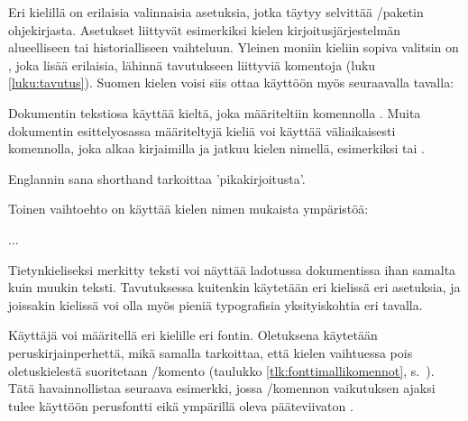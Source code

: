 \begin{koodilohkosis}
  \usepackage{polyglossia}
  \setdefaultlanguage{finnish}
\end{koodilohkosis}

Eri kielillä on erilaisia valinnaisia asetuksia, jotka täytyy selvittää
\-/paketin ohjekirjasta. Asetukset liittyvät
esimerkiksi kielen kirjoitusjärjestelmän alueelliseen tai
historialliseen vaihteluun. Yleinen moniin kieliin sopiva valitsin on
, joka lisää erilaisia, lähinnä tavutukseen
liittyviä komentoja (luku \ref{luku:tavutus}). Suomen kielen voisi siis
ottaa käyttöön myös seuraavalla tavalla:

\begin{koodilohkosis}
  \setdefaultlanguage[babelshorthands]{finnish}
\end{koodilohkosis}

Dokumentin tekstiosa käyttää kieltä, joka määriteltiin komennolla
. Muita dokumentin esittelyosassa
määriteltyjä kieliä voi käyttää väliaikaisesti komennolla, joka alkaa
kirjaimilla  ja jatkuu kielen nimellä, esimerkiksi
 tai .

\begin{koodilohkosis}
  Englannin sana \textenglish{shorthand} tarkoittaa 'pikakirjoitusta'.
\end{koodilohkosis}

Toinen vaihtoehto on käyttää kielen nimen mukaista ympäristöä:

\begin{koodilohkosis}
  \begin{greek}
    ...
  \end{greek}
\end{koodilohkosis}

Tietynkieliseksi merkitty teksti voi näyttää ladotussa dokumentissa ihan
samalta kuin muukin teksti. Tavutuksessa kuitenkin käytetään eri
kielissä eri asetuksia, ja joissakin kielissä voi olla myös pieniä
typografisia yksityiskohtia eri tavalla.

Käyttäjä voi määritellä eri kielille eri fontin. Oletuksena käytetään
peruskirjainperhettä, mikä samalla tarkoittaa, että kielen vaihtuessa
pois oletuskielestä suoritetaan \-/komento
(taulukko \ref{tlk:fonttimallikomennot},
s.~\pageref{tlk:fonttimallikomennot}). Tätä havainnollistaa seuraava
esimerkki, jossa \-/komennon vaikutuksen
ajaksi tulee käyttöön perusfontti  eikä ympärillä
oleva pääteviivaton .

